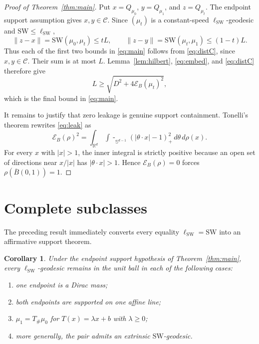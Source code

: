 \documentclass[11pt]{article}
\newtheorem{corollary}{Corollary}
\newcommand{\R}{\mathbb R}
\newcommand{\SW}{\mathrm{SW}}
\newcommand{\ellSW}{\ell_{\mathrm{SW}}}
\newcommand{\sphereavg}{\mathop{\int\!\!\!\!-}_{\mathbb S^{d-1}}}
\begin{document}
\begin{proof}[Proof of Theorem~\ref{thm:main}]
Put $x=Q_{\mu_0}$, $y=Q_{\mu_1}$, and $z=Q_{\mu_t}$. The endpoint support
assumption gives $x,y\in\mathcal C$. Since $(\mu_t)$ is a constant-speed
$\ellSW$-geodesic and $\SW\le\ellSW$,
\[
 \|z-x\|=\SW(\mu_0,\mu_t)\le tL,
 \qquad
 \|z-y\|=\SW(\mu_t,\mu_1)\le(1-t)L.
\]
Thus each of the first two bounds in \eqref{eq:main} follows from
\eqref{eq:distC}, since $x,y\in\mathcal C$. Their sum is at most $L$.
Lemma~\ref{lem:hilbert}, \eqref{eq:embed}, and \eqref{eq:distC} therefore give
\[
 L\ge\sqrt{D^2+4\mathcal E_B(\mu_t)^2},
\]
which is the final bound in \eqref{eq:main}.

It remains to justify that zero leakage is genuine support containment.
Tonelli's theorem rewrites \eqref{eq:leak} as
\[
 \mathcal E_B(\rho)^2
 =\int_{\R^d}\sphereavg (|\theta\cdot x|-1)_+^2\,d\theta\,d\rho(x).
\]
For every $x$ with $|x|>1$, the inner integral is strictly positive because
an open set of directions near $x/|x|$ has $|\theta\cdot x|>1$. Hence
$\mathcal E_B(\rho)=0$ forces $\rho(\overline B(0,1))=1$.
\end{proof}

\section{Complete subclasses}

The preceding result immediately converts every equality
$\ellSW=\SW$ into an affirmative support theorem.

\begin{corollary}\label{cor:classes}
Under the endpoint support hypothesis of Theorem~\ref{thm:main}, every
$\ellSW$-geodesic remains in the unit ball in each of the following cases:
\begin{enumerate}
 \item one endpoint is a Dirac mass;
 \item both endpoints are supported on one affine line;
 \item $\mu_1=T_\#\mu_0$ for $T(x)=\lambda x+b$ with $\lambda\ge0$;
 \item more generally, the pair admits an extrinsic $\SW$-geodesic.
\end{enumerate}
\end{corollary}
\end{document}
